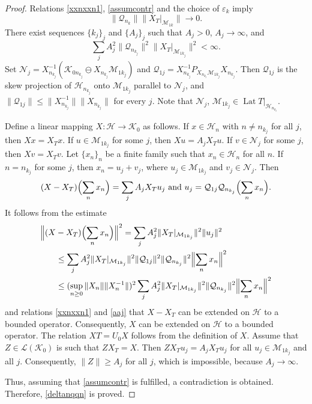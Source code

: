 \documentclass[a4paper,oneside,11pt]{amsart}
\numberwithin{equation}{section}
\theoremstyle{plain}
\theoremstyle{definition}
\begin{document}
\begin{proof}
Relations \eqref{xxnxxn1}, \eqref{assumcontr} and the choice of $\varepsilon_k$ imply
$$\|\mathcal Q_{n_k}\|\|X_T|_{\mathcal M_{1k}}\|\to 0.$$
There exist  sequences $\{k_j\}_j$ and $\{A_j\}_j$ such that $A_j>0$, $A_j\to\infty$, and 
\begin{equation} \label{aaj} \sum_j A_j^2 \|\mathcal Q_{n_{k_j}}\|^2\|X_T|_{\mathcal M_{1k_j}}\|^2<\infty.\end{equation}
Set $\mathcal N_j=X_{n_{k_j}}^{-1}(\mathcal K_{0n_{k_j}}\ominus X_{n_{k_j}}\mathcal M_{1k_j})$ and 
$\mathcal Q_{1j}=X_{n_{k_j}}^{-1} P_{X_{n_{k_j}}\mathcal M_{1k_j}}X_{n_{k_j}}$. Then 
 $\mathcal Q_{1j}$ is the skew  projection of $\mathcal H_{n_{k_j}}$ onto $\mathcal M_{1k_j}$ parallel to $\mathcal N_j$, 
and $\|\mathcal Q_{1j}\|\leq\|X_{n_{k_j}}^{-1}\|\|X_{n_{k_j}}\|$ for every $j$. 
 Note that $\mathcal N_j$, $\mathcal M_{1k_j}\in\operatorname{Lat}T|_{\mathcal H_{n_{k_j}}}$.

Define 
a linear mapping  $X\colon\mathcal H\to \mathcal K_0$ as follows. 
If $x\in\mathcal H_n$ with $n\neq n_{k_j}$ for all $j$, then $Xx=X_Tx$. 
If $u\in \mathcal M_{1k_j}$ for some $j$,  then $Xu= A_jX_Tu$. If $v\in\mathcal N_j$ for some $j$,   then $Xv=X_Tv$. 
Let $\{x_n\}_n$ be a finite family such that $x_n\in\mathcal H_n$ for all $n$. If $n=n_{k_j}$ for some $j$, then 
$x_n=u_j+v_j$, where $u_j\in\mathcal M_{1k_j}$ and $v_j\in\mathcal N_j$. 
Then $$(X -X_T)\Bigl(\sum_n x_n\Bigr)=\sum_j A_j X_T u_j \text{ and } u_j =
\mathcal Q_{1j}\mathcal Q_{n_{k_j}}\Bigl(\sum_n x_n\Bigr).$$
It follows from the estimate
\begin{equation*}\begin{aligned}\Bigl \|(X & -X_T)\Bigl(\sum_n x_n\Bigr)\Bigr \|^2 
 =\sum_j A_j^2\|X_T|_{\mathcal M_{1k_j}}\|^2\|u_j\|^2
\\ &
\leq \sum_j A_j^2\|X_T|_{\mathcal M_{1k_j}}\|^2\|\mathcal Q_{1j}\|^2\|\mathcal Q_{n_{k_j}}\|^2
\Bigl \|\sum_n x_n\Bigr \|^2
\\ & \leq
(\sup_{n\geq 0}\|X_n\|\|X_n^{-1}\|)^2\sum_j A_j^2\|X_T|_{\mathcal M_{1k_j}}\|^2\|\mathcal Q_{n_{k_j}}\|^2
\Bigl \|\sum_n x_n\Bigr \|^2\end{aligned}\end{equation*}
and relations \eqref{xxnxxn1} and \eqref{aaj} that $X-X_T$ can be  extended on $\mathcal H$ to a bounded operator. 
Consequently, $X$ can be  extended on $\mathcal H$ to a bounded operator. The relation $XT=U_0X$ follows from the definition of $X$. 
 Assume that $Z\in\mathcal L(\mathcal K_0)$ is such that $ZX_T=X$. Then $ZX_Tu_j=A_jX_Tu_j$ for all $u_j\in \mathcal M_{1k_j}$ and all $j$. 
Consequently, $\|Z\|\geq A_j$ for all $j$, which is impossible, because $A_j\to\infty$.

Thus, assuming that \eqref{assumcontr} is fulfilled, a contradiction is obtained. Therefore,  \eqref{deltanqqn} is proved.
\end{proof} 
\end{document}
